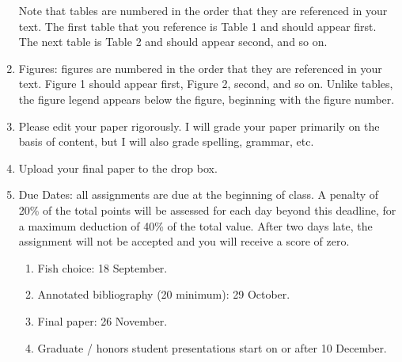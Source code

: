 \documentclass[12pt]{article}
\begin{document}
\begin{enumerate}
	\medskip
	Note that tables are numbered in the order that they are referenced in your text.  The first table that you reference is Table 1 and should appear first.  The next table is Table 2 and should appear second, and so on.
	
	\item Figures: figures are numbered in the order that they are referenced in your text.  Figure 1 should appear first, Figure 2, second, and so on.  Unlike tables, the figure legend appears below the figure, beginning with the figure number.  

	\item Please edit your paper rigorously. I will grade your paper primarily on the basis of content, but I will also grade spelling, grammar, etc.

	\item Upload your final paper to the drop box.  %

	\item Due Dates: all assignments are due at the beginning of class.  A penalty of 20\% of the total points will be assessed for each day beyond this deadline, for a maximum deduction of 40\% of the total value.  After two days late, the assignment will not be accepted and you will receive a score of zero.
	
	\begin{enumerate}[label=\alph*.]
		\item Fish choice: 18 September.
		\item Annotated bibliography (20 minimum): 29 October.
		\item Final paper: 26 November.
		\item Graduate / honors student presentations start on or after 10 December.
	\end{enumerate}
\end{enumerate}
\end{document}
